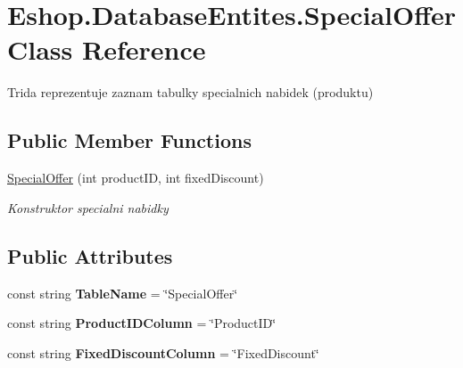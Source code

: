 \hypertarget{class_eshop_1_1_database_entites_1_1_special_offer}{}\section{Eshop.\+Database\+Entites.\+Special\+Offer Class Reference}
\label{class_eshop_1_1_database_entites_1_1_special_offer}


Trida reprezentuje zaznam tabulky specialnich nabidek (produktu)  


\subsection*{Public Member Functions}
\begin{DoxyCompactItemize}
\item 
\mbox{\hyperlink{class_eshop_1_1_database_entites_1_1_special_offer_a4519a20bc462191dbc9a654ca7d14bd6}{Special\+Offer}} (int product\+ID, int fixed\+Discount)
\begin{DoxyCompactList}\small\item\em Konstruktor specialni nabidky \end{DoxyCompactList}\end{DoxyCompactItemize}
\subsection*{Public Attributes}
\begin{DoxyCompactItemize}
\item 
\mbox{\label{class_eshop_1_1_database_entites_1_1_special_offer_a626baa3d94a29cfd86ef173dda5c8a29}} 
const string {\bfseries Table\+Name} = \char`\"{}Special\+Offer\char`\"{}
\item 
\mbox{\label{class_eshop_1_1_database_entites_1_1_special_offer_ac3199cf33937434a9b4eba6256fbc07d}} 
const string {\bfseries Product\+I\+D\+Column} = \char`\"{}Product\+ID\char`\"{}
\item 
\mbox{\label{class_eshop_1_1_database_entites_1_1_special_offer_aacc2e367b5d79b9972006fd41b7eb4c4}} 
const string {\bfseries Fixed\+Discount\+Column} = \char`\"{}Fixed\+Discount\char`\"{}
\end{DoxyCompactItemize}
